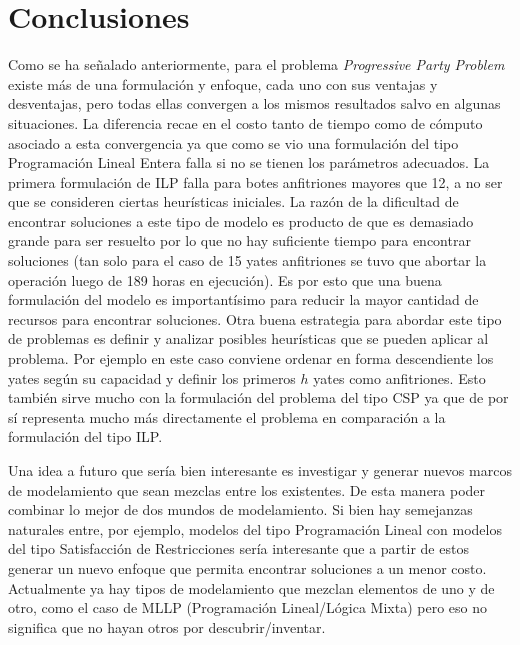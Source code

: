 \documentclass[letter, 10pt]{article}
\begin{document}

\section{Conclusiones}

Como se ha señalado anteriormente, para el problema \textit{Progressive Party Problem} existe más de una formulación y enfoque, cada uno con sus ventajas y desventajas, pero todas ellas convergen a los mismos resultados salvo en algunas situaciones. La diferencia recae en el costo tanto de tiempo como de cómputo asociado a esta convergencia ya que como se vio una formulación del tipo Programación Lineal Entera falla si no se tienen los parámetros adecuados. La primera formulación de ILP falla para botes anfitriones mayores que 12, a no ser que se consideren ciertas heurísticas iniciales. La razón de la dificultad de encontrar soluciones a este tipo de modelo es producto de que es demasiado grande para ser resuelto por lo que no hay suficiente tiempo para encontrar soluciones (tan solo para el caso de 15 yates anfitriones se tuvo que abortar la operación luego de 189 horas en ejecución\cite{Smith1996}). Es por esto que una buena formulación del modelo es importantísimo para reducir la mayor cantidad de recursos para encontrar soluciones. Otra buena estrategia para abordar este tipo de problemas es definir y analizar posibles heurísticas que se pueden aplicar al problema. Por ejemplo en este caso conviene ordenar en forma descendiente los yates según su capacidad y definir los primeros $h$ yates como anfitriones. Esto también sirve mucho con la formulación del problema del tipo CSP ya que de por sí representa mucho más directamente el problema en comparación a la formulación del tipo ILP.

Una idea a futuro que sería bien interesante es investigar y generar nuevos marcos de modelamiento que sean mezclas entre los existentes. De esta manera poder combinar lo mejor de dos mundos de modelamiento. Si bien hay semejanzas naturales entre, por ejemplo, modelos del tipo Programación Lineal con modelos del tipo Satisfacción de Restricciones sería interesante que a partir de estos generar un nuevo enfoque que permita encontrar soluciones a un menor costo. Actualmente ya hay tipos de modelamiento que mezclan elementos de uno y de otro, como el caso de MLLP (Programación Lineal/Lógica Mixta) pero eso no significa que no hayan otros por descubrir/inventar.
\end{document}
